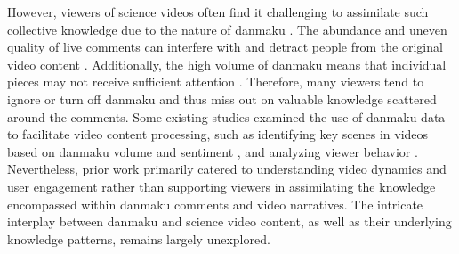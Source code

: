 However, viewers of science videos often find it challenging to assimilate such collective knowledge due to the nature of danmaku \cite{chen2015understanding, chen2024towards,ma2017video,yao2017understanding}. The abundance and uneven quality of live comments can interfere with and detract people from the original video content \cite{chen2015understanding,chen2024towards}. Additionally, the high volume of danmaku means that individual pieces may not receive sufficient attention \cite{ma2017video,yao2017understanding}. Therefore, many viewers tend to ignore or turn off danmaku and thus miss out on valuable knowledge scattered around the comments.
Some existing studies examined the use of danmaku data to facilitate video content processing, such as identifying key scenes in videos based on danmaku volume and sentiment \cite{sun2016videoforest}, and analyzing viewer behavior \cite{chen2022danmuvis}. 
Nevertheless, prior work primarily catered to understanding video dynamics and user engagement rather than supporting viewers in assimilating the knowledge encompassed within danmaku comments and video narratives. 
The intricate interplay between danmaku and science video content, as well as their underlying knowledge patterns, remains largely unexplored.


